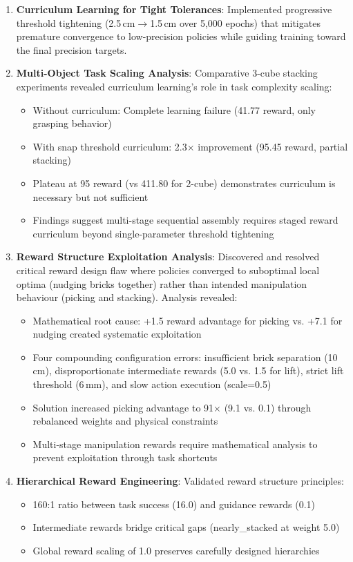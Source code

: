 \documentclass[12pt,a4paper,oneside]{report}
\begin{document}
\begin{enumerate}
    \item \textbf{Curriculum Learning for Tight Tolerances}: Implemented progressive threshold tightening (2.5\,cm$\rightarrow$1.5\,cm over 5{,}000 epochs) that mitigates premature convergence to low-precision policies while guiding training toward the final precision targets.

    \item \textbf{Multi-Object Task Scaling Analysis}: Comparative 3-cube stacking experiments revealed curriculum learning's role in task complexity scaling:
    \begin{itemize}
        \item Without curriculum: Complete learning failure (41.77 reward, only grasping behavior)
        \item With snap threshold curriculum: 2.3$\times$ improvement (95.45 reward, partial stacking)
        \item Plateau at 95 reward (vs 411.80 for 2-cube) demonstrates curriculum is necessary but not sufficient
        \item Findings suggest multi-stage sequential assembly requires staged reward curriculum beyond single-parameter threshold tightening
    \end{itemize}

    \item \textbf{Reward Structure Exploitation Analysis}: Discovered and resolved critical reward design flaw where policies converged to suboptimal local optima (nudging bricks together) rather than intended manipulation behaviour (picking and stacking). Analysis revealed:
    \begin{itemize}
        \item Mathematical root cause: +1.5 reward advantage for picking vs. +7.1 for nudging created systematic exploitation
        \item Four compounding configuration errors: insufficient brick separation (10\,cm), disproportionate intermediate rewards (5.0 vs. 1.5 for lift), strict lift threshold (6\,mm), and slow action execution (scale=0.5)
        \item Solution increased picking advantage to 91$\times$ (9.1 vs. 0.1) through rebalanced weights and physical constraints
        \item Multi-stage manipulation rewards require mathematical analysis to prevent exploitation through task shortcuts
    \end{itemize}

    \item \textbf{Hierarchical Reward Engineering}: Validated reward structure principles:
    \begin{itemize}
        \item 160:1 ratio between task success (16.0) and guidance rewards (0.1)
        \item Intermediate rewards bridge critical gaps (nearly\_stacked at weight 5.0)
        \item Global reward scaling of 1.0 preserves carefully designed hierarchies
    \end{itemize}
\end{enumerate}
\end{document}
